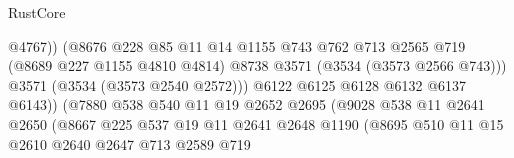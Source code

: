 \begin{lexlean}{RustCore}
\begin{coremodule}
                                              @4767))
                                          (@8676
                                            @228
                                            @85
                                            @11
                                            @14
                                            @1155
                                            @743
                                            @762
                                            @713
                                            @2565
                                            @719
                                            (@8689 @227 @1155 @4810 @4814)
                                            @8738
                                            @3571
                                            (@3534 (@3573 @2566 @743)))
                                          @3571
                                          (@3534 (@3573 @2540 @2572)))
                                        @6122
                                        @6125
                                        @6128
                                        @6132
                                        @6137
                                        @6143))
                                    (@7880
                                      @538
                                      @540
                                      @11
                                      @19
                                      @2652
                                      @2695
                                      (@9028
                                        @538
                                        @11
                                        @2641
                                        @2650
                                        (@8667
                                          @225
                                          @537
                                          @19
                                          @11
                                          @2641
                                          @2648
                                          @1190
                                          (@8695
                                            @510
                                            @11
                                            @15
                                            @2610
                                            @2640
                                            @2647
                                            @713
                                            @2589
                                            @719

\end{coremodule}
\end{lexlean}

